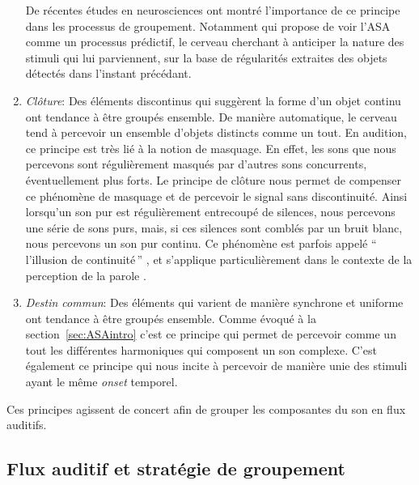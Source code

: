 \begin{enumerate}
De récentes études en neurosciences ont montré l'importance de ce principe dans les processus de groupement. Notamment \citep{winkler2009modeling} qui propose de voir l'ASA comme un processus prédictif, le cerveau cherchant à anticiper la nature des stimuli qui lui parviennent, sur la base de régularités extraites des objets détectés dans l'instant précédant.

\item \emph{Clôture}: Des éléments discontinus qui suggèrent la forme d'un objet continu ont tendance à être groupés ensemble. De manière automatique, le cerveau tend à percevoir un ensemble d'objets distincts comme un tout. En audition, ce principe est très lié à la notion de masquage. En effet, les sons que nous percevons sont régulièrement masqués par d'autres sons concurrents, éventuellement plus forts. Le principe de clôture nous permet de compenser ce phénomène de masquage et de percevoir le signal sans discontinuité. Ainsi lorsqu'un son pur est régulièrement entrecoupé de silences, nous percevons une série de sons purs, mais, si ces silences sont comblés par un bruit blanc, nous percevons un son pur continu. Ce phénomène est parfois appelé ``\,l’illusion de continuité\,'' \citep{dannenbring1976perceived}, et s'applique particulièrement dans le contexte de la perception de la parole \citep{carlyon2002continuity}.

\item \emph{Destin commun}: Des éléments qui varient de manière synchrone et uniforme ont tendance à être groupés ensemble. Comme évoqué à la section~\ref{sec:ASAintro} c'est ce principe qui permet de percevoir comme un tout les différentes harmoniques qui composent un son complexe. C'est également ce principe qui nous incite à percevoir de manière unie des stimuli ayant le même \emph{onset} temporel.
\end{enumerate}

Ces principes agissent de concert afin de grouper les composantes du son en flux auditifs.

\subsection{Flux auditif et stratégie de groupement}


